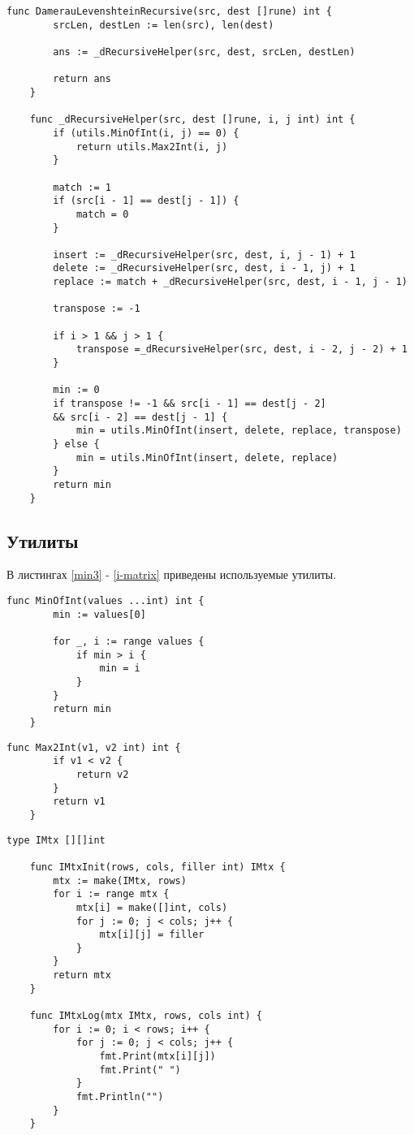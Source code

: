 \begin{lstlisting}[label=damer-lev-rec,caption=Программный код нахождения расстояния Дамерау -- Левенштейна рекурсивно]	
	func DamerauLevenshteinRecursive(src, dest []rune) int {
		srcLen, destLen := len(src), len(dest)
		
		ans := _dRecursiveHelper(src, dest, srcLen, destLen)
		
		return ans
	}
	
	func _dRecursiveHelper(src, dest []rune, i, j int) int {
		if (utils.MinOfInt(i, j) == 0) {
			return utils.Max2Int(i, j)
		}
		
		match := 1
		if (src[i - 1] == dest[j - 1]) {
			match = 0
		}
		
		insert := _dRecursiveHelper(src, dest, i, j - 1) + 1
		delete := _dRecursiveHelper(src, dest, i - 1, j) + 1
		replace := match + _dRecursiveHelper(src, dest, i - 1, j - 1)
		
		transpose := -1
		
		if i > 1 && j > 1 {
			transpose =_dRecursiveHelper(src, dest, i - 2, j - 2) + 1
		}
		
		min := 0
		if transpose != -1 && src[i - 1] == dest[j - 2] 
		&& src[i - 2] == dest[j - 1] {
			min = utils.MinOfInt(insert, delete, replace, transpose)
		} else {
			min = utils.MinOfInt(insert, delete, replace)
		}
		return min
	}
\end{lstlisting}

\subsection{Утилиты}
В листингах \ref{min3} - \ref{i-matrix} приведены используемые утилиты.
\begin{lstlisting}[label=min3,caption=Функция нахождения минимума из N целых чисел]
	func MinOfInt(values ...int) int {
		min := values[0]
		
		for _, i := range values {
			if min > i {
				min = i
			}
		}
		return min
	}
\end{lstlisting}

\begin{lstlisting}[label=max2,caption=Функция нахождения максимума из двух целых чисел]
	func Max2Int(v1, v2 int) int {
		if v1 < v2 {
			return v2
		}
		return v1
	}
\end{lstlisting}


\begin{lstlisting}[label=i-matrix,caption=Определение типа целочисленной матрицы; его инициализация и вывод]
	type IMtx [][]int
	
	func IMtxInit(rows, cols, filler int) IMtx {
		mtx := make(IMtx, rows)
		for i := range mtx {
			mtx[i] = make([]int, cols)
			for j := 0; j < cols; j++ {
				mtx[i][j] = filler
			}
		}
		return mtx
	}
	
	func IMtxLog(mtx IMtx, rows, cols int) {
		for i := 0; i < rows; i++ {
			for j := 0; j < cols; j++ {
				fmt.Print(mtx[i][j])
				fmt.Print(" ")
			}
			fmt.Println("")
		}
	}
\end{lstlisting}

